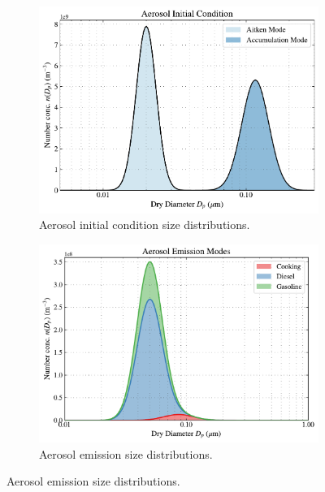 \begin{figure}[h]
  \centering
  \begin{subfigure}
    \centering
    \includegraphics[width=.85\textwidth]{figures/chapter3/urban-plume-aerosol-ic.pdf}
    \caption{Aerosol initial condition size distributions.}
    \label{fig:aero_ic_dist}
  \end{subfigure}
   \vspace*{5mm} 
  \begin{subfigure}
    \centering
    \includegraphics[width=.85\textwidth]{figures/chapter3/urban-plume-aerosol-emissions.pdf}
    \caption{Aerosol emission size distributions.}
    \label{fig:aero_emiss_dist}
  \end{subfigure}
\end{figure}



